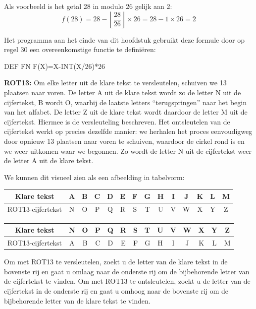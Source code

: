 Als voorbeeld is het getal 28 in modulo 26 gelijk aan 2:
\[
	f(28) = 28 - \left\lfloor{\frac{28}{26}}\right\rfloor \times 26 = 28 - 1 \times 26 = 2
\]

Het programma aan het einde van dit hoofdstuk gebruikt deze formule door op regel 30 een overeenkomstige functie te definiëren:

\begin{screencode}
DEF FN F(X)=X-INT(X/26)*26
\end{screencode}

{\bf ROT13:} Om elke letter uit de klare tekst te versleutelen, schuiven we 13 plaatsen naar voren. De letter A uit de klare tekst wordt zo de letter N uit de cijfertekst, B wordt O, waarbij de laatste letters ``terugspringen'' naar het begin van het alfabet. De letter Z uit de klare tekst wordt daardoor de letter M uit de cijfertekst. Hiermee is de versleuteling beschreven. Het ontsleutelen van de cijfertekst werkt op precies dezelfde manier: we herhalen het proces eenvoudigweg door opnieuw 13 plaatsen naar voren te schuiven, waardoor de cirkel rond is en we weer uitkomen waar we begonnen. Zo wordt de letter N uit de cijfertekst weer de letter A uit de klare tekst.

We kunnen dit visueel zien als een afbeelding in tabelvorm:

\Large
\begin{center}
  \begin{tabular}{|c|c|c|c|c|c|c|c|c|c|c|c|c|c|}
  \hline
    Klare tekst & A & B & C & D & E & F & G & H & I & J & K & L & M \\ \hline	ROT13-cijfertekst & N & O & P & Q & R & S & T & U & V & W & X & Y & Z \\ \hline
  \end{tabular}
\end{center}

\begin{center}
  \begin{tabular}{|c|c|c|c|c|c|c|c|c|c|c|c|c|c|}
  \hline
    Klare tekst & N & O & P & Q & R & S & T & U & V & W & X & Y & Z \\ \hline	ROT13-cijfertekst & A & B & C & D & E & F & G & H & I & J & K & L & M \\ \hline
  \end{tabular}
\end{center}

\normalsize

Om met ROT13 te versleutelen, zoekt u de letter van de klare tekst in de bovenste rij en gaat u omlaag naar de onderste rij om de bijbehorende letter van de cijfertekst te vinden. Om met ROT13 te ontsleutelen, zoekt u de letter van de cijfertekst in de onderste rij en gaat u omhoog naar de bovenste rij om de bijbehorende letter van de klare tekst te vinden.

